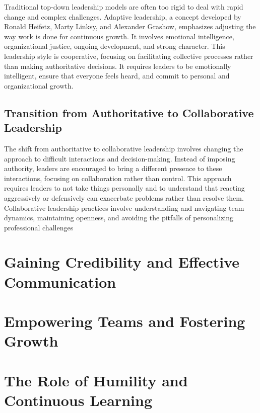 \documentclass[runningheads]{llncs}
\begin{document}
Traditional top-down leadership models are often too rigid to deal with rapid change and complex challenges. Adaptive leadership, a concept developed by Ronald Heifetz, Marty Linksy, and Alexander Grashow, emphasizes adjusting the way work is done for continuous growth. It involves emotional intelligence, organizational justice, ongoing development, and strong character. This leadership style is cooperative, focusing on facilitating collective processes rather than making authoritative decisions. It requires leaders to be emotionally intelligent, ensure that everyone feels heard, and commit to personal and organizational growth.

\subsection{Transition from Authoritative to Collaborative Leadership}

The shift from authoritative to collaborative leadership involves changing the approach to difficult interactions and decision-making. Instead of imposing authority, leaders are encouraged to bring a different presence to these interactions, focusing on collaboration rather than control. This approach requires leaders to not take things personally and to understand that reacting aggressively or defensively can exacerbate problems rather than resolve them. Collaborative leadership practices involve understanding and navigating team dynamics, maintaining openness, and avoiding the pitfalls of personalizing professional challenges

\section{Gaining Credibility and Effective Communication}

\section{Empowering Teams and Fostering Growth}

\section{The Role of Humility and Continuous Learning}
\end{document}
